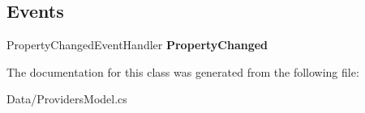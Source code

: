 \subsection*{Events}
\begin{DoxyCompactItemize}
\item 
\mbox{\label{class_a_f_h___scheduler_1_1_data_1_1_providers_model_aac3272a84dd296b87222330490ca54eb}} 
Property\+Changed\+Event\+Handler {\bfseries Property\+Changed}
\end{DoxyCompactItemize}


The documentation for this class was generated from the following file\+:\begin{DoxyCompactItemize}
\item 
Data/Providers\+Model.\+cs\end{DoxyCompactItemize}
